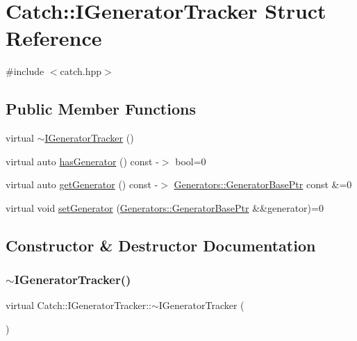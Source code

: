 \hypertarget{struct_catch_1_1_i_generator_tracker}{}\section{Catch\+:\+:I\+Generator\+Tracker Struct Reference}
\label{struct_catch_1_1_i_generator_tracker}


{\ttfamily \#include $<$catch.\+hpp$>$}

\subsection*{Public Member Functions}
\begin{DoxyCompactItemize}
\item 
virtual \mbox{\hyperlink{struct_catch_1_1_i_generator_tracker_a20b3c82baa68f821c180d6dac1234eb1}{$\sim$\+I\+Generator\+Tracker}} ()
\item 
virtual auto \mbox{\hyperlink{struct_catch_1_1_i_generator_tracker_ae88084f9af27c8b9a5d5775b9c148498}{has\+Generator}} () const -\/$>$ bool=0
\item 
virtual auto \mbox{\hyperlink{struct_catch_1_1_i_generator_tracker_a23be942fc51672598bfa02c678c3078a}{get\+Generator}} () const -\/$>$ \mbox{\hyperlink{namespace_catch_1_1_generators_a1519f304113619d7d18670e2f08276c0}{Generators\+::\+Generator\+Base\+Ptr}} const \&=0
\item 
virtual void \mbox{\hyperlink{struct_catch_1_1_i_generator_tracker_a9945eff42219edc5a7071eebd8b0419e}{set\+Generator}} (\mbox{\hyperlink{namespace_catch_1_1_generators_a1519f304113619d7d18670e2f08276c0}{Generators\+::\+Generator\+Base\+Ptr}} \&\&generator)=0
\end{DoxyCompactItemize}


\subsection{Constructor \& Destructor Documentation}
\mbox{\label{struct_catch_1_1_i_generator_tracker_a20b3c82baa68f821c180d6dac1234eb1}} 
\subsubsection{\texorpdfstring{$\sim$\+I\+Generator\+Tracker()}{~IGeneratorTracker()}}
{\footnotesize\ttfamily virtual Catch\+::\+I\+Generator\+Tracker\+::$\sim$\+I\+Generator\+Tracker (\begin{DoxyParamCaption}{ }\end{DoxyParamCaption})\hspace{0.3cm}{\ttfamily [virtual]}}



